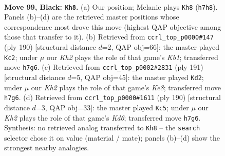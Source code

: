 \documentclass[11pt]{article}
\begin{document}
\clearpage

\begin{figure}[p]\centering
\begin{subfigure}{0.46\textwidth}\centering
\resizebox{\linewidth}{!}{%
\newchessgame
\chessboard[
  setfen={8/1R5k/8/8/8/7K/5p2/3r4 b - - 13 99},
  showmover=false,
  pgfstyle=straightmove, color=movearrow, markmove={h7-h8}
]}
\caption{}
\end{subfigure}\hfill
\begin{subfigure}{0.46\textwidth}\centering
\resizebox{\linewidth}{!}{%
\newchessgame
\chessboard[
  setfen={1k6/8/8/8/8/2R5/8/1K5r w - - 22 96},
  showmover=false,
  pgfstyle=straightmove, color=movearrow, markmove={b1-c2}
]}
\caption{}
\end{subfigure}
\\[4pt]
\begin{subfigure}{0.46\textwidth}\centering
\resizebox{\linewidth}{!}{%
\newchessgame
\chessboard[
  setfen={8/7r/8/8/4p3/4P3/6K1/R3k3 b - - 13 96},
  showmover=false,
  pgfstyle=straightmove, color=movearrow, markmove={e1-d2}
]}
\caption{}
\end{subfigure}\hfill
\begin{subfigure}{0.46\textwidth}\centering
\resizebox{\linewidth}{!}{%
\newchessgame
\chessboard[
  setfen={3k4/7R/3K2r1/8/3P4/8/8/8 w - - 19 96},
  showmover=false,
  pgfstyle=straightmove, color=movearrow, markmove={d6-c5}
]}
\caption{}
\end{subfigure}
\caption{\textbf{Move 99, Black: \texttt{Kh8}.} (a) Our position; Melanie plays \texttt{Kh8} (\texttt{h7h8}). Panels (b)--(d) are the retrieved master positions whose correspondence most drove this move (highest QAP objective among those that transfer to it). (b) Retrieved from \texttt{ccrl\_top\_p0000\#147} (ply 190) [structural distance $d$=2, QAP obj=66]: the master played \texttt{Kc2}; under $\mu$ our \emph{Kh2} plays the role of that game's \emph{Kb1}; transferred move \texttt{h7g6}. (c) Retrieved from \texttt{ccrl\_top\_p0002\#2831} (ply 191) [structural distance $d$=5, QAP obj=45]: the master played \texttt{Kd2}; under $\mu$ our \emph{Kh2} plays the role of that game's \emph{Ke8}; transferred move \texttt{h7g6}. (d) Retrieved from \texttt{ccrl\_top\_p0000\#1611} (ply 190) [structural distance $d$=3, QAP obj=33]: the master played \texttt{Kc5}; under $\mu$ our \emph{Kh2} plays the role of that game's \emph{Kd6}; transferred move \texttt{h7g6}. Synthesis: no retrieved analog transferred to \texttt{Kh8} -- the \texttt{search} selector chose it on value (material / mate); panels (b)--(d) show the strongest nearby analogies.}
\label{fig:thought-m197}
\end{figure}
\end{document}
